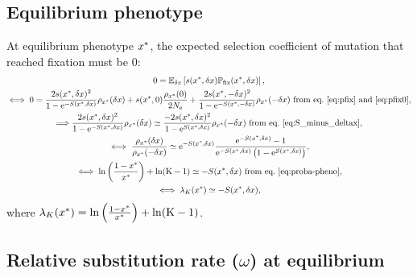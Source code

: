 \subsection{Equilibrium phenotype}
\label{subsec:equilibrium-phenotype}

At equilibrium phenotype $x^{*}$, the expected selection coefficient of mutation that reached fixation must be $0$:
\begin{gather}
    0 = \operatorname{\mathbb{E}}_{\delta x} \left[ s(x^{*}, \delta x) \mathbb{P}_{\text{fix}}(x^{*}, \delta x) \right], \\
    \iff 0 = \frac{ 2 s(x^{*}, \delta x)^2}{1 - \text{e}^{-S(x^{*}, \delta x)}}   \rho_{x^{*}}(\delta x) + s(x^{*}, 0) \frac{ \rho_{x^{*}}(0)}{2N_{\text{e}}} + \frac{ 2s(x^{*}, -\delta x)^2}{1 - \text{e}^{-S(x^{*}, -\delta x)}} \rho_{x^{*}}(-\delta x)\text{ from eq.~\ref{eq:pfix} and~\ref{eq:pfix0}}, \\
    \Longrightarrow \frac{ 2s(x^{*}, \delta x)^2}{1 - \text{e}^{-S(x^{*}, \delta x)}}   \rho_{x^{*}}(\delta x) \simeq \frac{ - 2s(x^{*}, \delta x)^2}{1 - \text{e}^{S(x^{*}, \delta x)}}   \rho_{x^{*}}(-\delta x) \text{ from eq.~\ref{eq:S_minus_deltax}}, \\
    \iff \frac{ \rho_{x^{*}}(\delta x)}{\rho_{x^{*}}(-\delta x)} \simeq \text{e}^{-S(x^{*}, \delta x)} \frac{ \text{e}^{-S(x^{*}, \delta x)} - 1}{ \text{e}^{-S(x^{*}, \delta x)} \left( 1 - \text{e}^{S(x^{*}, \delta x)} \right)}, \\
    \iff \ln \left( \frac{1 - x^{*}}{x^{*}} \right) + \ln (\text{K}-1) \simeq -S(x^{*}, \delta x) \text{ from eq.~\ref{eq:proba-pheno}} \label{eq:equilibrium-pheno}, \\
    \iff \lambda_{K}(x^{*}) \simeq -S(x^{*}, \delta x) \label{eq:equilibrium_lambda},
\end{gather}
where  $\lambda_{K}(x^{*}) = \ln \left( \frac{1 - x^{*}}{x^{*}} \right) + \ln (\text{K}-1)$.

\subsection{Relative substitution rate (\texorpdfstring{$\omega$}{ω}) at equilibrium}
\label{subsec:mean-scaled-fixation-probability-omega-at-equilibrium}

